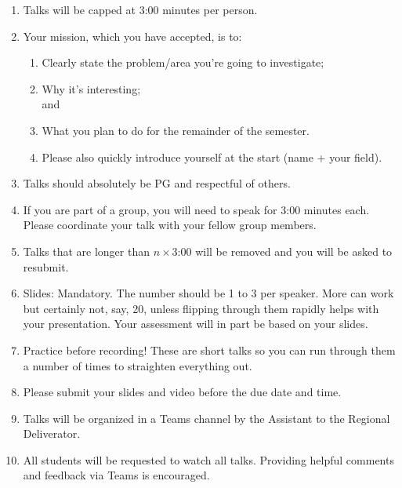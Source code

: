 \begin{enumerate}
\item
  Talks will be capped at 3:00 minutes per person.
\item
  Your mission, which you have accepted, is to:
  \begin{enumerate}
  \item 
    Clearly state the problem/area you're going to investigate;
  \item 
    Why it's interesting;\\
    and
  \item 
    What you plan to do for the remainder of the semester.
  \item 
    Please also quickly introduce yourself at the start (name + your field).
  \end{enumerate}

\item
  Talks should absolutely be PG and respectful of others.
\item
  If you are part of a group, you will need to speak for 3:00 minutes
  each. Please coordinate your talk with your fellow group members.
\item
  Talks that are longer than $n \times$3:00 will be removed and you will be asked to resubmit.
\item
  Slides: Mandatory. The number should be 1 to 3 per speaker.
  More
  can work but certainly not, say, 20, unless
  flipping through them rapidly helps with your presentation.
  Your assessment will in part be based on your slides.
\item
  Practice before recording!  These are short talks so you can run through
  them a number of times to straighten everything out.
\item
  Please submit your slides and video before the due date and time.
\item
  Talks will be organized in a Teams channel by the Assistant to the Regional Deliverator.
\item
  All students will be requested to watch all talks.
  Providing helpful comments and feedback via Teams is encouraged.
  

\end{enumerate}



